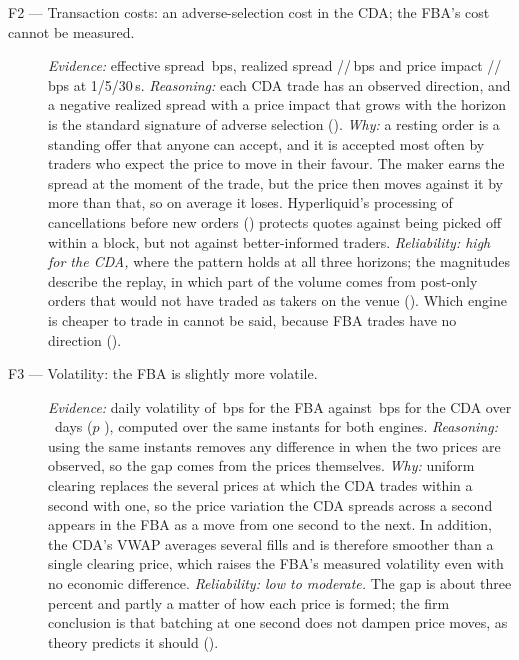 \begin{description}
  \item[F2 --- Transaction costs: an adverse-selection cost in the CDA;
  the FBA's cost cannot be measured.] \emph{Evidence:} effective spread
  \ResEffectiveSpreadCda\,bps, realized spread
  \ResRealizedSpreadOneSCda/\ResRealizedSpreadFiveSCda/\ResRealizedSpreadThirtySCda\,bps
  and price impact
  \ResPriceImpactOneSCda/\ResPriceImpactFiveSCda/\ResPriceImpactThirtySCda\,bps
  at 1/5/30\,s. \emph{Reasoning:} each CDA trade has an observed direction,
  and a negative realized spread with a price impact that grows with the
  horizon is the standard signature of adverse selection
  (). \emph{Why:} a resting order is a
  standing offer that anyone can accept, and it is accepted most often by
  traders who expect the price to move in their favour. The maker earns
  the spread at the moment of the trade, but the price then moves against
  it by more than that, so on average it loses. Hyperliquid's processing of
  cancellations before new orders () protects quotes
  against being picked off within a block, but not against better-informed
  traders. \emph{Reliability: high for the CDA,} where the pattern holds at
  all three horizons; the magnitudes describe the replay, in which part of
  the volume comes from post-only orders that would not have traded as
  takers on the venue (). Which engine is cheaper
  to trade in cannot be said, because FBA trades have no direction
  ().

  \item[F3 --- Volatility: the FBA is slightly more volatile.]
  \emph{Evidence:} daily volatility of \ResMatchedVolFba\,bps for the FBA
  against \ResMatchedVolCda\,bps for the CDA over \ResMatchedVolNPaired\
  days ($p$ \ResMatchedVolP), computed over the same instants for both
  engines. \emph{Reasoning:} using the same instants removes any
  difference in when the two prices are observed, so the gap comes from the
  prices themselves. \emph{Why:} uniform clearing replaces the several
  prices at which the CDA trades within a second with one, so the price
  variation the CDA spreads across a second appears in the FBA as a move
  from one second to the next. In addition, the CDA's VWAP averages several
  fills and is therefore smoother than a single clearing price, which
  raises the FBA's measured volatility even with no economic difference.
  \emph{Reliability: low to moderate.} The gap is about three percent and
  partly a matter of how each price is formed; the firm conclusion is that
  batching at one second does not dampen price moves, as theory predicts it
  should (\Cref{tab:theorylinks}).


\end{description}
